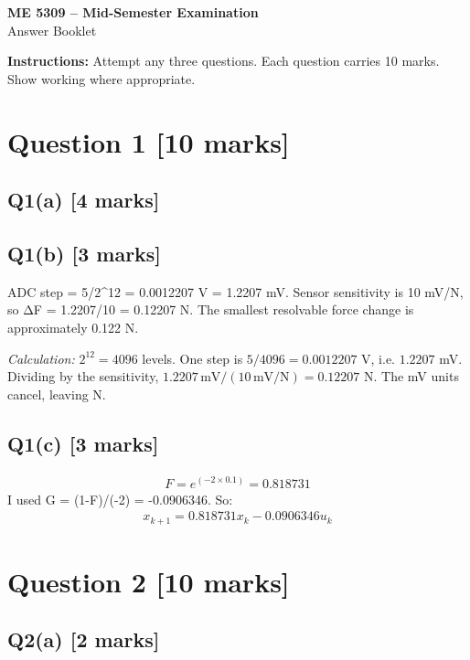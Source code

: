 \documentclass[11pt,a4paper]{article}
\begin{document}
\begin{center}
{\Large\bfseries ME 5309 -- Mid-Semester Examination}\\[3pt]
{\large Answer Booklet}\\[8pt]
\end{center}
\textbf{Instructions:} Attempt any three questions. Each question carries 10 marks. Show working where appropriate.
\section*{Question 1 \hfill [10 marks]}
\subsection*{Q1(a) \hfill [4 marks]}

\vspace{2mm}

\subsection*{Q1(b) \hfill [3 marks]}

ADC step = 5/2\textasciicircum{}12 = 0.0012207 V = 1.2207 mV.
Sensor sensitivity is 10 mV/N, so ΔF = 1.2207/10 = 0.12207 N.
The smallest resolvable force change is approximately 0.122 N.\par\smallskip\textit{Calculation:} $2^{12}=4096$ levels. One step is $5/4096=0.0012207$ V, i.e. $1.2207$ mV. Dividing by the sensitivity, $1.2207\,\mathrm{mV}/(10\,\mathrm{mV/N})=0.12207$ N. The mV units cancel, leaving N.

\subsection*{Q1(c) \hfill [3 marks]}

\[\begin{aligned}F = e^(-2\times0.1) = 0.818731\end{aligned}\]
I used G = (1-F)/(-2) = -0.0906346.
So:\[\begin{aligned}x_{k+1} = 0.818731x_k - 0.0906346u_k\end{aligned}\]

\section*{Question 2 \hfill [10 marks]}
\subsection*{Q2(a) \hfill [2 marks]}
\end{document}
